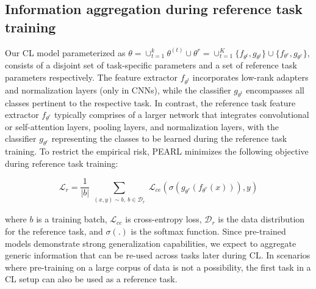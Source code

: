 \documentclass[10pt]{article} %
\begin{document}

\subsection{Information aggregation during reference task training}
Our CL model parameterized as $\theta = \cup_{t=1}^k \theta^{(t)} \cup \theta^r  = \cup_{t=1}^K \{f_{\theta^{t}}, g_{\theta^{t}}  \} \cup \{f_{\theta^{r}}, g_{\theta^{r}}\}$, consists of a disjoint set of task-specific parameters and a set of reference task parameters respectively. The feature extractor $f_{\theta^{t}}$ incorporates low-rank adapters and normalization layers (only in CNNs), while the classifier $g_{\theta^{t}}$  encompasses all classes pertinent to the respective task. In contrast, the reference task feature extractor $f_{\theta^{r}}$ typically comprises of a larger network that integrates convolutional or self-attention layers, pooling layers, and normalization layers, with the classifier $g_{\theta^{r}}$ representing the classes to be learned during the reference task training. To restrict the empirical risk, PEARL minimizes the following objective during reference task training:


\begin{equation}
    \mathcal{L}_{r} = \frac{1}{\left|b\right|} \sum_{\substack{(x, y) \sim b, ~ b \in  \mathcal{D}_{r}}} \mathcal{L}_{ce} (\sigma (g_{\theta^{r}}(f_{\theta^{r}}(x))), y)
\label{eqn_reference_task}
\end{equation}

where ${b}$ is a training batch, $\mathcal{L}_{ce}$ is cross-entropy loss, $\mathcal{D}_{r}$ is the data distribution for the reference task, and $\sigma(.)$ is the softmax function. Since pre-trained models demonstrate strong generalization capabilities, we expect to aggregate generic information that can be re-used across tasks later during CL. In scenarios where pre-training on a large corpus of data is not a possibility, the first task in a CL setup can also be used as a reference task. 
\end{document}
